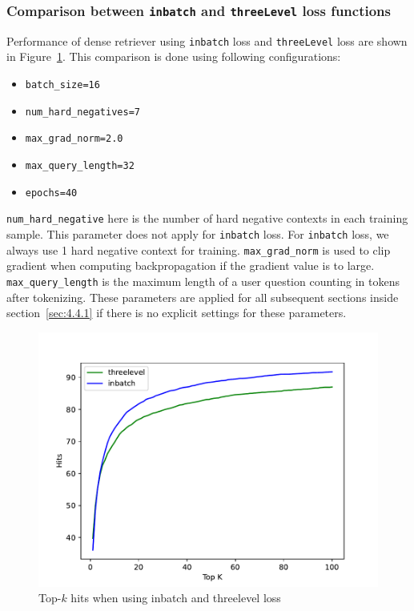 \documentclass[12pt, sort&compress]{report}
\begin{document}
\subsubsection{Comparison between {\tt inbatch} and {\tt threeLevel} loss functions}
\label{sec:4.4.1.1}
Performance of dense retriever using {\tt inbatch} loss and {\tt threeLevel} loss are shown in Figure~\ref{fig:12}. This comparison is done using following configurations:
\begin{itemize}
	\item {\tt batch\_size=16}
	\item {\tt num\_hard\_negatives=7}
	\item {\tt max\_grad\_norm=2.0}
	\item {\tt max\_query\_length=32}
	\item {\tt epochs=40}
\end{itemize}
\par {\tt num\_hard\_negative} here is the number of hard negative contexts in each training sample. This parameter does not apply for {\tt inbatch} loss. For {\tt inbatch} loss, we always use 1 hard negative context for training. {\tt max\_grad\_norm} is used to clip gradient when computing backpropagation if the gradient value is to large. {\tt max\_query\_length} is the maximum length of a user question counting in tokens after tokenizing. These parameters are applied for all subsequent sections inside section~\ref{sec:4.4.1} if there is no explicit settings for these parameters.
\begin{figure}[!htbp]
	\centering
	\includegraphics[scale=.7]{images/PDF/experiments/inbatch_threelevel_4-1-1.pdf}
	\caption{Top-$k$ hits when using inbatch and threelevel loss}
	\label{fig:12}
\end{figure}
\end{document}
